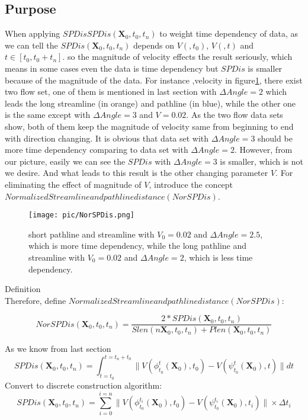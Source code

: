 \documentclass[
     11pt,         %
     a4paper,      %
     oneside,
     ]{article}
\newcommand{\vect}[1]{\boldsymbol{#1}}
\begin{document}
	\subsection{Purpose} 
	 When applying $SPDisSPDis(\vect{X}_{0},t_{0},t_{n})$ to weight time dependency of data, as  we can tell the $SPDis(\vect{X}_{0},t_{0},t_{n})$ depends on $V(,t_{0})$, $V(,t)$ and $t\in [t_{0},t_{0}+t_{n}]$. so
	 the magnitude of velocity effects the result seriously, which means in some cases even the data is time dependency but $SPDis$ is smaller because of the magnitude of the data. For instance ,velocity in figure\ref*{fig:NorSPDis}, there exist two flow set, one of them is mentioned in last section with $\Delta Angle=2$ which leads the long streamline (in orange) and pathline (in blue), while the other one is the same except with $\Delta Angle=3$ and $V=0.02$. As the two flow data sets show, both of them keep the magnitude of velocity same from beginning to end with direction changing. It is obvious that data set with $\Delta Angle=3$ should be more time dependency comparing to data set with $\Delta Angle=2$. However, from  our picture, easily we can see the $SPDis$ with $\Delta Angle=3$ is smaller, which is not we desire. And what leads to this result is the other changing parameter $V$. For eliminating the effect of magnitude of $V$, introduce the concept $Normalized Streamline and pathline distance (NorSPDis)$.
	 	\begin{figure}[H]
	 		\centering
	 		\texttt{[image: pic/NorSPDis.png]}
	 		\caption{\tiny short pathline and streamline with $V_{0}=0.02$ and $\Delta Angle=2.5$, which is more time dependency, while the long pathline and streamline with $V_{0}=0.02$ and $\Delta Angle=2$, which is less time dependency.}
	 		\label{fig:NorSPDis}
	 	\end{figure} 
	 Definition \\
	 Therefore, define $Normalized Streamline and pathline distance (NorSPDis):$ 
	 
	 $$NorSPDis(\vect{X}_{0},t_{0},t_{n})=\frac{2*SPDis(\vect{X}_{0},t_{0},t_{n})}{Slen(n\vect{X}_{0},t_{0},t_{n})+Plen(\vect{X}_{0},t_{0},t_{n})}$$
	 
	As we know from last section $$	SPDis(\vect{X}_{0},t_{0},t_{n})=\int_{t=t_{0}}^{t=t_{n}+t_{0}}\biggr\lVert V(\phi_{t_{0}}^{t}(\vect{X}_{0}),t_{0})-V(\psi_{t_{0}}^{t}(\vect{X}_{0}),t)\biggr\rVert dt$$
	Convert to discrete construction algorithm:\\
	 $$	SPDis(\vect{X}_{0},t_{0},t_{n})=\sum_{i=0}^{i=n}\biggr\lVert V(\phi_{t_{0}}^{t_{i}}(\vect{X}_{0}),t_{0})-V(\psi_{t_{0}}^{t_{i}}(\vect{X}_{0}),t_{i})\biggr\rVert\times\Delta t_{i}$$
	 
\end{document}
